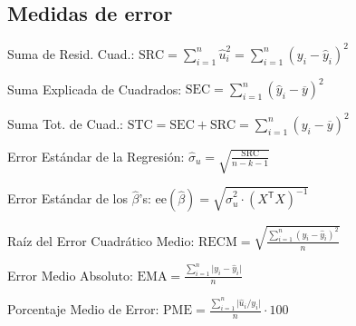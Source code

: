 \documentclass[10pt, a4paper, landscape]{article}
\newcommand{\se}{\mathrm{ee}}
\newcommand{\SSR}{\mathrm{SRC}}
\newcommand{\SSE}{\mathrm{SEC}}
\newcommand{\SST}{\mathrm{STC}}
\newcommand{\tr}{\mathsf{T}}
\begin{document}
\begin{multicols}{3}
		\begin{center}
		\end{center}
		
		\subsection*{Medidas de error}
		
		Suma de Resid. Cuad.: \hfill $\SSR = \sum_{i=1}^{n} \hat{u}_{i}^{2} = \sum_{i=1}^{n} (y_{i} - \hat{y}_{i})^{2}$
		
		Suma Explicada de Cuadrados: \hfill $\SSE = \sum_{i=1}^{n} (\hat{y}_{i} - \overline{y})^{2}$
		
		Suma Tot. de Cuad.: \hfill $\SST = \SSE + \SSR = \sum_{i=1}^{n} (y_{i} - \overline{y})^{2}$
		
		Error Estándar de la Regresión: \hfill $\hat{\sigma}_{u} = \sqrt{\frac{\SSR}{n - k - 1}}$
		
		Error Estándar de los $\hat{\beta}$'s: \hfill $\se(\hat{\beta}) = \sqrt{\hat{\sigma}^{2}_{u} \cdot (X^{\tr} X)^{-1}}$
		
		Raíz del Error Cuadrático Medio: \hfill $\mathrm{RECM} = \sqrt{\frac{\sum_{i=1}^{n} (y_{i} - \hat{y}_{i})^{2}}{n}}$
		
		Error Medio Absoluto: \hfill $\mathrm{EMA} = \frac{\sum_{i=1}^{n} \lvert y_{i} - \hat{y}_{i} \rvert}{n}$
		
		Porcentaje Medio de Error: \hfill $\mathrm{PME} = \frac{\sum_{i=1}^{n} \lvert \hat{u}_{i} / y_{i} \rvert}{n} \cdot 100$
		
		\columnbreak
		

\end{multicols}
\end{document}

